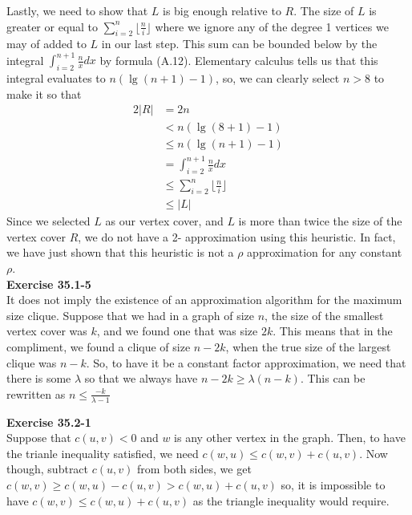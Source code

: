 \documentclass{article}
\begin{document}
Lastly, we need to show that $L$ is big enough relative to $R$. The size of $L$ is greater or equal to $\sum_{i=2}^n \lfloor\frac{n}{i}\rfloor $ where we ignore any of the degree 1 vertices we may of added to $L$ in our last step. This sum can be bounded below by the integral $\int_{i=2}^{n+1} \frac{n}{x}dx$ by formula (A.12). Elementary calculus tells us that this integral evaluates to $n(\lg(n+1) - 1)$, so, we can clearly select $n>8$ to make it so that 
\begin{align*}
2|R| &= 2n\\
 &< n(\lg(8+1) -1)\\
  &\le n(\lg(n+1) - 1)\\
  &=\int_{i=2}^{n+1} \frac{n}{x}dx\\
  &\le \sum_{i=2}^n \lfloor\frac{n}{i}\rfloor\\
  &\le |L|
  \end{align*}
  Since we selected $L$ as our vertex cover, and $L$ is more than twice the size of the vertex cover $R$, we do not have a 2- approximation using this heuristic. In fact, we have just shown that this heuristic is not a $\rho$ approximation for any constant $\rho$.\\
  
  


\noindent\textbf{Exercise 35.1-5}\\

It does not imply the existence of an approximation algorithm for the maximum size clique. Suppose that we had in a graph of size $n$, the size of the smallest vertex cover was $k$, and we found one that was size $2k$. This means that in the compliment, we found a clique of size $n-2k$, when the true size of the largest clique was $n-k$. So, to have it be a constant factor approximation, we need that there is some $\lambda$ so that we always have $n-2k \ge \lambda (n-k)$. This can be rewritten as $ n \le \frac{-k}{\lambda -1}$



\noindent\textbf{Exercise 35.2-1}\\

Suppose that $c(u,v) < 0$ and $w$ is any other vertex in the graph. Then, to have the trianle inequality satisfied, we need $c(w,u) \le c(w,v) + c(u,v)$. Now though, subtract $c(u,v)$ from both sides, we get $c(w,v) \ge c(w,u) - c(u,v) > c(w,u) +c(u,v)$ so, it is impossible to have $c(w,v) \le c(w,u)+c(u,v)$ as the triangle inequality would require.\\
\end{document}
